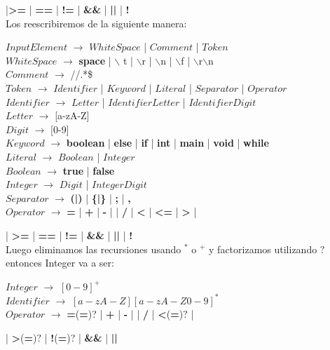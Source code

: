 \hspace{1.5cm}|{\bf >=} | {\bf ==} | {\bf !=} | {\bf \&\&} | {\bf ||} | {\bf !}\\

Los reescribiremos de la siguiente manera:

\noindent$InputElement$ $\rightarrow$ $WhiteSpace$ | $Comment$ | $Token$ \\
$WhiteSpace$ $\rightarrow$ {\bf space} | $\backslash$ t | $\backslash$r | $\backslash$n | $\backslash$f | $\backslash$r$\backslash$n \\
$Comment$ $\rightarrow$ //.*\$ \\
$Token$ $\rightarrow$ $Identifier$ | $Keyword$ | $Literal$ | $Separator$ | $Operator$ \\
$Identifier$ $\rightarrow$ $Letter$ | $Identifier$$Letter$ | $Identifier$$Digit$ \\
$Letter$ $\rightarrow$ [a-zA-Z]\\
$Digit$ $\rightarrow$ [0-9] \\
$Keyword$ $\rightarrow$ {\bf boolean} | {\bf else} | {\bf if} | {\bf int} | {\bf main} | {\bf void} | {\bf while} \\
$Literal$ $\rightarrow$ $Boolean$ | $Integer$ \\ 
$Boolean$ $\rightarrow$ {\bf true} | {\bf false}\\
$Integer$ $\rightarrow$ $Digit$ | $Integer$$Digit$ \\
$Separator$ $\rightarrow$ {\bf (|)} | {\bf\{|\}} | {\bf;} | {\bf,}\\
$Operator$ $\rightarrow$ {\bf =} | {\bf  +} | {\bf -} | {\bf *} | {\bf /} | {\bf <} | {\bf <= } | {\bf> } |

\hspace{1.5cm}              | {\bf >=} | {\bf ==} | {\bf !=} | {\bf \&\&} | {\bf ||} | {\bf !}\\


Luego eliminamos las recursiones usando $^{*}$ o $^{+}$ y factorizamos utilizando $?$ entonces Integer va a ser:

\noindent$Integer$ $\rightarrow$ $[0-9]^{+}$ \\
$Identifier$ $\rightarrow$ $[a-zA-Z][a-zA-Z0-9]^{*}$ \\
$Operator$ $\rightarrow$ {\bf =}({\bf =})? | {\bf  +} | {\bf -} | {\bf *} | {\bf /} | {\bf <}({\bf =})$?$ |

\hspace{1.5cm}              | {\bf >}({\bf =})$?$ | {\bf !}({\bf =})? | {\bf \&\&} | {\bf ||}\\


